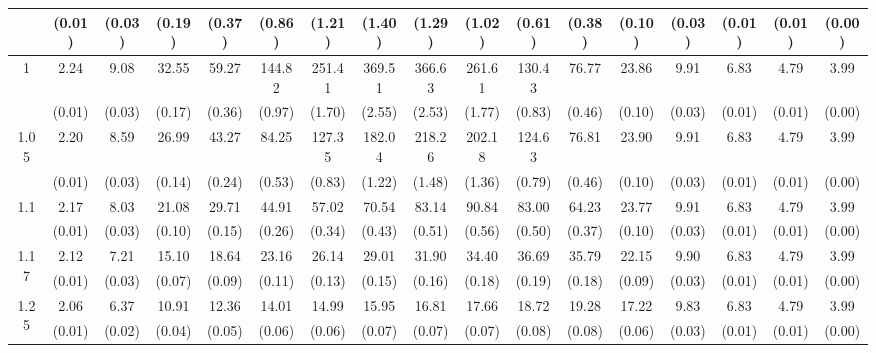 \documentclass[12pt]{article}  %
\theoremstyle{plain}
\begin{document}
\begin{sidewaystable}[htbp]
\begin{tabular}{ccccccccccccccccc}
                      & (0.01)& (0.03)& (0.19)& (0.37)& (0.86)& (1.21)& (1.40)& (1.29)& (1.02)&  (0.61)&  (0.38)&  (0.10)&  (0.03)&  (0.01)&  (0.01) &    (0.00)\\ \hline
\multirow{2}{*}{1}  & 2.24& 9.08& 32.55& 59.27 &144.82 &251.41& 369.51& 366.63& 261.61 &130.43& 76.77 &23.86 & 9.91 & 6.83 & 4.79 & 3.99\\
                      & (0.01)& (0.03)& (0.17)& (0.36)& (0.97)& (1.70)& (2.55)& (2.53)& (1.77)&  (0.83)&  (0.46)&  (0.10)&  (0.03)&  (0.01)&  (0.01)&     (0.00)\\ \hline                                                                     
\multirow{2}{*}{1.05}  &2.20 &8.59 &26.99 &43.27  &84.25 &127.35& 182.04 &218.26& 202.18 &124.63& 76.81 &23.90 & 9.91 & 6.83 & 4.79  &3.99\\
                      & (0.01) &(0.03) &(0.14) &(0.24)& (0.53)& (0.83)& (1.22)& (1.48)& (1.36)&  (0.79)&  (0.46)&  (0.10)&  (0.03)&  (0.01)&  (0.01)&     (0.00)\\ \hline                                                                                                                                          
\multirow{2}{*}{1.1}  &2.17 &8.03 &21.08 &29.71 & 44.91 & 57.02 & 70.54 & 83.14 & 90.84 & 83.00& 64.23& 23.77 & 9.91 & 6.83 & 4.79 & 3.99\\
                      &  (0.01)& (0.03)& (0.10)& (0.15)& (0.26)& (0.34)& (0.43)& (0.51)& (0.56)&  (0.50)&  (0.37)&  (0.10)&  (0.03)&  (0.01)&  (0.01)&     (0.00)\\ \hline
\multirow{2}{*}{1.17}  &2.12 &7.21 &15.10 &18.64 & 23.16 & 26.14 & 29.01 & 31.90 & 34.40&  36.69& 35.79& 22.15 & 9.90&  6.83 & 4.79 & 3.99\\
                      &  (0.01)& (0.03)& (0.07)& (0.09)& (0.11)& (0.13)& (0.15)& (0.16)& (0.18)&  (0.19)&  (0.18)&  (0.09)&  (0.03)&  (0.01)&  (0.01)&     (0.00)\\ \hline                                                                                                                                                                                                                                                                                    
                                                                     \multirow{2}{*}{1.25}  &2.06 &6.37& 10.91& 12.36 & 14.01 & 14.99 & 15.95 & 16.81 & 17.66 & 18.72& 19.28& 17.22 & 9.83 & 6.83 & 4.79 & 3.99\\
                      &  (0.01)& (0.02)& (0.04)& (0.05)& (0.06)& (0.06)& (0.07)& (0.07)& (0.07)&  (0.08)&  (0.08)&  (0.06)&  (0.03)&  (0.01)&  (0.01)&     (0.00)\\ \hline                                                                                                                                                                                                                                                                                    

\end{tabular}
\end{sidewaystable}
\end{document}
